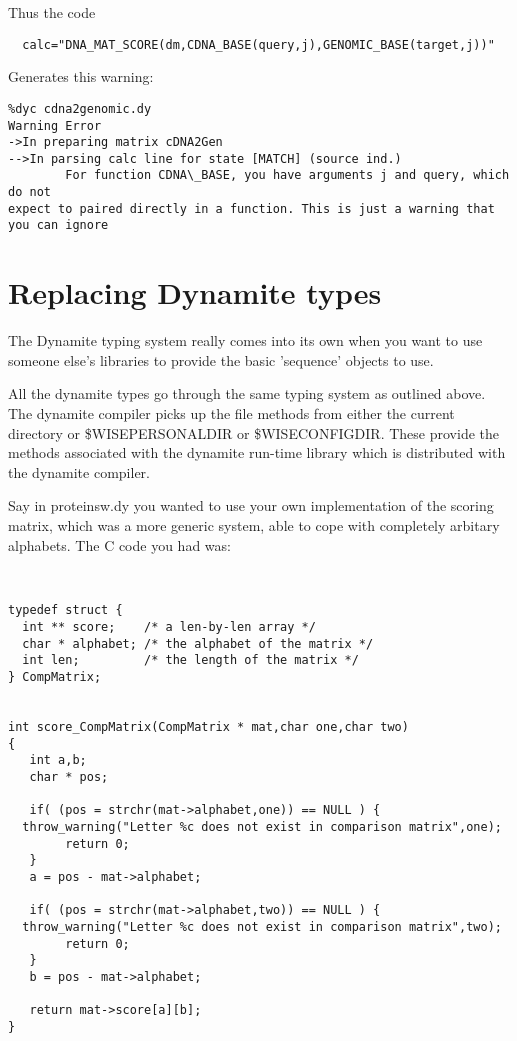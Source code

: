 Thus the code

\begin{verbatim}
  calc="DNA_MAT_SCORE(dm,CDNA_BASE(query,j),GENOMIC_BASE(target,j))"
\end{verbatim}

Generates this warning:

\begin{verbatim}
%dyc cdna2genomic.dy
Warning Error
->In preparing matrix cDNA2Gen
-->In parsing calc line for state [MATCH] (source ind.)
        For function CDNA\_BASE, you have arguments j and query, which do not
expect to paired directly in a function. This is just a warning that
you can ignore
\end{verbatim}

\section{Replacing Dynamite types}
The Dynamite typing system really comes into its own when you want to
use someone else's libraries to provide the basic 'sequence' objects to
use.

All the dynamite types go through the same typing system as outlined
above. The dynamite compiler picks up the file methods from either
the current directory or \$WISEPERSONALDIR or \$WISECONFIGDIR. These
provide the methods associated with the dynamite run-time library
which is distributed with the dynamite compiler.

Say in proteinsw.dy you wanted to use your own implementation of the
scoring matrix, which was a more generic system, able to cope with
completely arbitary alphabets. The C code you had was:

\begin{verbatim}


typedef struct {
  int ** score;    /* a len-by-len array */
  char * alphabet; /* the alphabet of the matrix */
  int len;         /* the length of the matrix */    
} CompMatrix;


int score_CompMatrix(CompMatrix * mat,char one,char two)
{
   int a,b;
   char * pos;

   if( (pos = strchr(mat->alphabet,one)) == NULL ) {
  throw_warning("Letter %c does not exist in comparison matrix",one);
        return 0;
   }  
   a = pos - mat->alphabet;

   if( (pos = strchr(mat->alphabet,two)) == NULL ) {
  throw_warning("Letter %c does not exist in comparison matrix",two);
        return 0;
   }  
   b = pos - mat->alphabet;

   return mat->score[a][b];
}

\end{verbatim}

